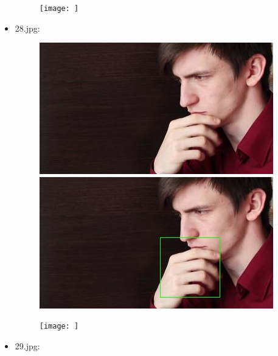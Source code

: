 \begin{itemize}
\begin{figure}[!htb]
\begin{minipage}{0.33\textwidth}
            \end{minipage}\hfill
            \begin{minipage}{0.33\textwidth}
                \centering
                \texttt{[image: ]}
            \end{minipage}
        \end{figure}
    \item 28.jpg:
        \begin{figure}[!htb]
            \begin{minipage}{0.33\textwidth}
            \centering
            \includegraphics[scale = 0.45]{images/results/original/28.jpg}
            \end{minipage}\hfill
            \begin{minipage}{0.33\textwidth}
                \centering
                \includegraphics[scale = 0.45]{images/results/detection/28_detections.jpg}
            \end{minipage}\hfill
            \begin{minipage}{0.33\textwidth}
                \centering
                \texttt{[image: ]}
            \end{minipage}
        \end{figure}
    \newpage
    \item 29.jpg:
        \begin{figure}[!htb]
            \begin{minipage}{0.33\textwidth}

\end{minipage}
\end{figure}
\end{itemize}
